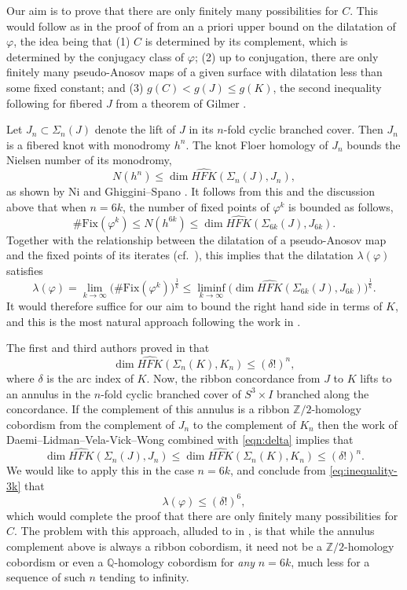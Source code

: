 \documentclass[11pt]{amsart}
\numberwithin{equation}{section}
\numberwithin{theorem}{section}
\theoremstyle{definition}
\newcommand{\Z}{\mathbb{Z}}
\newcommand{\Q}{\mathbb{Q}}
\newcommand\HFK{\widehat{\mathit{HFK}}}
\begin{document}
Our aim is  to prove that there are only finitely many possibilities for  $C$. This would follow as in the proof of \cite[Theorem~1.2]{bs-ribbon} from an a priori upper bound on the dilatation  of $\varphi$, the idea being that (1) $C$ is determined by its complement, which is determined by the conjugacy class of $\varphi$; (2) up to conjugation, there are only finitely many pseudo-Anosov maps of a given surface with dilatation less than some fixed constant; and (3) $g(C) < g(J)\leq g(K)$, the second inequality following for fibered $J$ from a theorem of Gilmer \cite{gilmer}.

Let $J_n\subset \Sigma_n(J)$ denote the lift of $J$ in its $n$-fold cyclic branched cover. Then $J_n$ is a fibered knot with monodromy $h^n$. The knot Floer homology of $J_n$ bounds the Nielsen number of its monodromy, \[N(h^n) \leq \dim \HFK(\Sigma_n(J),J_n),\] as shown by Ni \cite{ni-fixed} and Ghiggini--Spano \cite{ghiggini-spano}. It follows from this and the discussion above that when $n=6k$, the number of fixed points of $\varphi^k$ is bounded as follows, \[\#\mathrm{Fix}(\varphi^k) \leq N(h^{6k}) \leq \dim \HFK(\Sigma_{6k}(J),J_{6k}).\]
Together with the relationship between the dilatation of a pseudo-Anosov map and the fixed points of its iterates (cf.~\cite[Lemma 2.4]{bs-ribbon}), this implies that the dilatation $\lambda(\varphi)$ satisfies  \begin{equation}\label{eq:inequality-3k}\lambda(\varphi)  = \lim_{k\to \infty}\big( \#\mathrm{Fix}(\varphi^k)\big)^{\frac{1}{k}} \leq \liminf_{k\to \infty} \big(\dim \HFK(\Sigma_{6k}(J),J_{6k})\big )^{\frac{1}{k}}.\end{equation}  It would therefore suffice for our aim to bound the right hand side in terms of $K$, and this is the most natural approach following the work in \cite{bs-ribbon}.

The first and third authors proved in \cite[Lemma~2.1]{bs-ribbon} that
\begin{equation} \label{eqn:delta}
\dim \HFK(\Sigma_{n}(K),K_{n}) \leq (\delta!)^n,
\end{equation}
where $\delta$ is the arc index of $K$. Now, the ribbon concordance from $J$ to $K$ lifts to an annulus in the $n$-fold cyclic branched cover of $S^3\times I$ branched along the concordance. If the complement of this annulus is a ribbon $\mathbb{Z}/2$-homology cobordism from the complement of $J_n$ to the complement  of $K_{n}$ then the work of Daemi--Lidman--Vela-Vick--Wong \cite{dlvvw} combined with \eqref{eqn:delta} implies that
\begin{equation} \label{eq:inequality-intro}
\dim \HFK(\Sigma_{n}(J),J_{n})\leq \dim \HFK(\Sigma_{n}(K),K_{n}) \leq (\delta!)^n.
\end{equation}
We would like to apply this in the case $n=6k$, and conclude from \eqref{eq:inequality-3k} that \[\lambda(\varphi) \leq (\delta!)^6,\] which would complete the proof that there are only finitely many possibilities for $C$. The problem with this approach, alluded to in \cite[\S3]{bs-ribbon}, is that while the annulus complement above is always a ribbon cobordism, it need not be a $\Z/2$-homology cobordism or even a $\Q$-homology cobordism for \emph{any} $n=6k$, much less for a sequence of such $n$ tending to infinity.  
\end{document}
